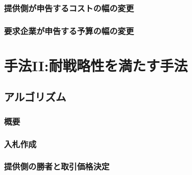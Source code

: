 \hypertarget{ux63d0ux4f9bux5074ux304cux7533ux544aux3059ux308bux30b3ux30b9ux30c8ux306eux5e45ux306eux5909ux66f4}{%
\subsection{提供側が申告するコストの幅の変更}\label{ux63d0ux4f9bux5074ux304cux7533ux544aux3059ux308bux30b3ux30b9ux30c8ux306eux5e45ux306eux5909ux66f4}}

\hypertarget{ux8981ux6c42ux4f01ux696dux304cux7533ux544aux3059ux308bux4e88ux7b97ux306eux5e45ux306eux5909ux66f4}{%
\subsection{要求企業が申告する予算の幅の変更}\label{ux8981ux6c42ux4f01ux696dux304cux7533ux544aux3059ux308bux4e88ux7b97ux306eux5e45ux306eux5909ux66f4}}

\hypertarget{ux624bux6cd5iiux8010ux6226ux7565ux6027ux3092ux6e80ux305fux3059ux624bux6cd5}{%
\chapter{手法II:耐戦略性を満たす手法}\label{ux624bux6cd5iiux8010ux6226ux7565ux6027ux3092ux6e80ux305fux3059ux624bux6cd5}}

\hypertarget{ux30a2ux30ebux30b4ux30eaux30baux30e0-1}{%
\section{アルゴリズム}\label{ux30a2ux30ebux30b4ux30eaux30baux30e0-1}}

\hypertarget{ux6982ux8981-1}{%
\subsection{概要}\label{ux6982ux8981-1}}

\hypertarget{ux5165ux672dux4f5cux6210-1}{%
\subsection{入札作成}\label{ux5165ux672dux4f5cux6210-1}}

\hypertarget{ux63d0ux4f9bux5074ux306eux52ddux8005ux3068ux53d6ux5f15ux4fa1ux683cux6c7aux5b9a}{%
\subsection{提供側の勝者と取引価格決定}\label{ux63d0ux4f9bux5074ux306eux52ddux8005ux3068ux53d6ux5f15ux4fa1ux683cux6c7aux5b9a}}

